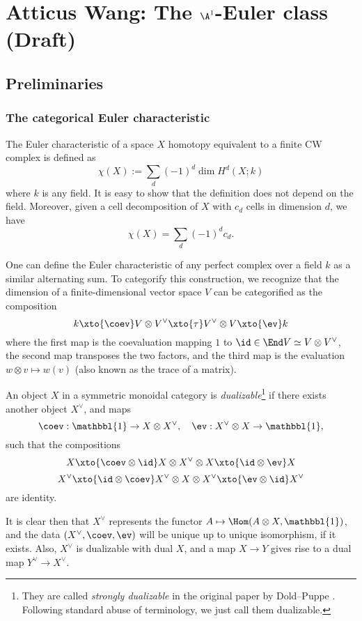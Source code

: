 \section{Atticus Wang: The $\A^1$-Euler class (Draft)}

\subsection{Preliminaries}

\subsubsection{The categorical Euler characteristic}

The Euler characteristic of a space $X$ homotopy equivalent to a finite CW complex is defined as
\[\chi(X):=\sum_d(-1)^d \dim H^d(X;k)\]
where $k$ is any field. It is easy to show that the definition does not depend on the field. Moreover, given a cell decomposition of $X$ with $c_d$ cells in dimension $d$, we have
\[\chi(X)=\sum_d (-1)^d c_d.\]


One can define the Euler characteristic of any perfect complex over a field $k$ as a similar alternating sum. To categorify this construction, we recognize that the dimension of a finite-dimensional vector space $V$ can be categorified as the composition
\[k \xto{\coev} V \otimes V^\vee \xto{\tau} V^\vee \otimes V \xto{\ev} k\]
where the first map is the coevaluation mapping $1$ to $\id\in \End V\simeq V\otimes V^\vee$, the second map transposes the two factors, and the third map is the evaluation $w\otimes v\mapsto w(v)$ (also known as the trace of a matrix). 

\begin{definition}

An object $X$ in a symmetric monoidal category is \emph{dualizable}\footnote{They are called \emph{strongly dualizable} in the original paper by Dold--Puppe \cite{DoldPuppe}. Following standard abuse of terminology, we just call them dualizable.} if there exists another object $X^\vee$, and maps 
\[\coev: \mathbbl{1}\to X\otimes X^\vee, \quad \ev: X^\vee\otimes X\to \mathbbl{1}, \]
such that the compositions
\[X\xto{\coev\otimes \id} X\otimes X^\vee\otimes X \xto{\id\otimes \ev} X \]
\[X^\vee\xto{\id\otimes \coev} X^\vee\otimes X \otimes X^\vee \xto{\ev\otimes \id} X^\vee\]
are identity.

\end{definition}

It is clear then that $X^\vee$ represents the functor $A\mapsto \Hom(A\otimes X, \mathbbl{1})$, and the data $(X^\vee, \coev, \ev)$ will be unique up to unique isomorphism, if it exists. Also, $X^\vee$ is dualizable with dual $X$, and a map $X\to Y$ gives rise to a dual map $Y^\vee \to X^\vee$.

